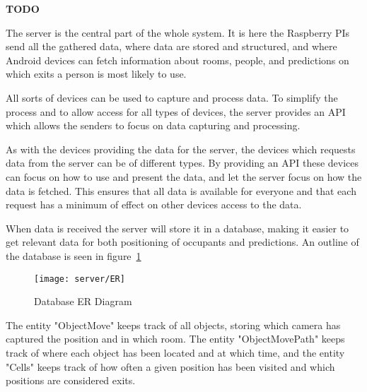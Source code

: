 {\color[rgb]{1,0,0} \textbf{\large TODO}}

The server is the central part of the whole system. It is here the Raspberry PIs send all the gathered data, where data are stored and structured, and where Android devices can fetch information about rooms, people, and predictions on which exits a person is most likely to use.

All sorts of devices can be used to capture and process data. To simplify the process and to allow access for all types of devices, the server provides an API which allows the senders to focus on data capturing and processing.

As with the devices providing the data for the server, the devices which requests data from the server can be of different types. By providing an API these devices can focus on how to use and present the data, and let the server focus on how the data is fetched. This ensures that all data is available for everyone and that each request has a minimum of effect on other devices access to the data.

When data is received the server will store it in a database, making it easier to get relevant data for both positioning of occupants and predictions. An outline of the database is seen in figure~\ref{fig:database_er_diagram} 

\begin{figure}[htb]
	\centering
	\texttt{[image: server/ER]}
	\caption{Database ER Diagram}
	\label{fig:database_er_diagram}
\end{figure}

The entity "ObjectMove" keeps track of all objects, storing which camera has captured the position and in which room. The entity "ObjectMovePath" keeps track of where each object has been located and at which time, and the entity "Cells" keeps track of how often a given position has been visited and which positions are considered exits.
